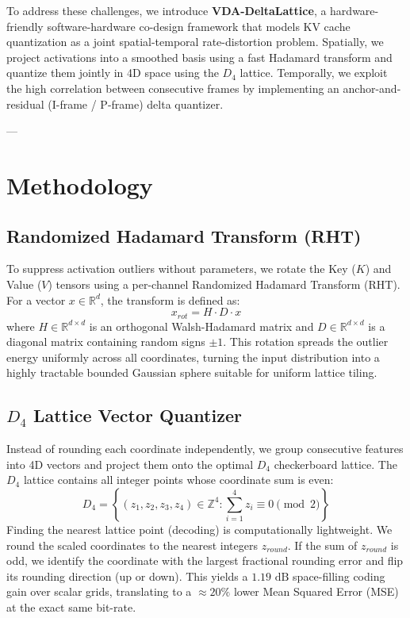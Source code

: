 \documentclass[10pt,twocolumn,letterpaper]{article}
\begin{document}
To address these challenges, we introduce \textbf{VDA-DeltaLattice}, a hardware-friendly software-hardware co-design framework that models KV cache quantization as a joint spatial-temporal rate-distortion problem. Spatially, we project activations into a smoothed basis using a fast Hadamard transform and quantize them jointly in 4D space using the $D_4$ lattice. Temporally, we exploit the high correlation between consecutive frames by implementing an anchor-and-residual (I-frame / P-frame) delta quantizer.

---

\section{Methodology}

\subsection{Randomized Hadamard Transform (RHT)}
To suppress activation outliers without parameters, we rotate the Key ($K$) and Value ($V$) tensors using a per-channel Randomized Hadamard Transform (RHT). For a vector $x \in \mathbb{R}^d$, the transform is defined as:
\begin{equation}
    x_{rot} = H \cdot D \cdot x
\end{equation}
where $H \in \mathbb{R}^{d \times d}$ is an orthogonal Walsh-Hadamard matrix and $D \in \mathbb{R}^{d \times d}$ is a diagonal matrix containing random signs $\pm 1$. This rotation spreads the outlier energy uniformly across all coordinates, turning the input distribution into a highly tractable bounded Gaussian sphere suitable for uniform lattice tiling.

\subsection{$D_4$ Lattice Vector Quantizer}
Instead of rounding each coordinate independently, we group consecutive features into 4D vectors and project them onto the optimal $D_4$ checkerboard lattice. The $D_4$ lattice contains all integer points whose coordinate sum is even:
\begin{equation}
    D_4 = \left\{ (z_1, z_2, z_3, z_4) \in \mathbb{Z}^4 : \sum_{i=1}^4 z_i \equiv 0 \pmod 2 \right\}
\end{equation}
Finding the nearest lattice point (decoding) is computationally lightweight. We round the scaled coordinates to the nearest integers $z_{round}$. If the sum of $z_{round}$ is odd, we identify the coordinate with the largest fractional rounding error and flip its rounding direction (up or down). This yields a $1.19\text{ dB}$ space-filling coding gain over scalar grids, translating to a $\approx 20\%$ lower Mean Squared Error (MSE) at the exact same bit-rate.
\end{document}
